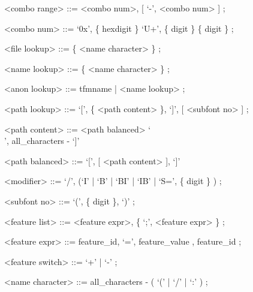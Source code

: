       <combo range>      ::= <combo num>, [ `-', <combo num> ] ;

      <combo num>        ::= `0x', \{ {\sc hexdigit}  \}
      \alt                   `U+', \{ {\sc digit} \}
      \alt                   \{ {\sc digit} \} ;

      <file lookup>      ::= \{ <name character> \} ;

      <name lookup>      ::= \{ <name character> \} ;

      <anon lookup>      ::= {\sc tfmname} | <name lookup> ;

      <path lookup>      ::= `[', \{ <path content> \}, `]', [ <subfont no> ] ;

      <path content>     ::= <path balanced>
      \alt                   `\\', {\sc all_characters}
       - `]'

      <path balanced>    ::= `[', [ <path content> ], `]'

      <modifier>         ::= `/', (`I' | `B' | `BI' | `IB' | `S=', \{ {\sc digit} \} ) ;

      <subfont no>       ::= `(', \{ {\sc digit} \}, `)' ;

      <feature list>     ::= <feature expr>, \{ `;', <feature expr> \} ;

      <feature expr>     ::= {\sc feature_id}, `=', {\sc feature_value}
      , {\sc feature_id} ;

      <feature switch>   ::= `+' | `-' ;

      <name character>   ::= {\sc all_characters} - ( `(' | `/' | `:' ) ;
\endsyntaxfloat


